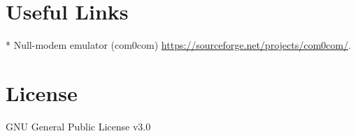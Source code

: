 \documentclass[a4paper]{article}
\begin{document}
\section*{Useful Links}

* Null-modem emulator (com0com) \href{https://sourceforge.net/projects/com0com/}{https://sourceforge.net/projects/com0com/}. 

\section*{License}

GNU General Public License v3.0
\end{document}

